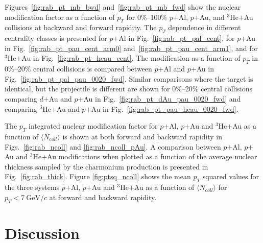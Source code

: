 \documentclass[twocolumn,letterpaper,aps,prc,longbibliography,superscriptaddress,nofootinbib,floatfix]{revtex4-1}
\newcommand{\pt}{\mbox{$p_T$}\xspace}
\newcommand{\meanncoll}{\mbox{$\langle N_{\mathrm coll} \rangle$}\xspace}
\newcommand{\meanptsq}{\mbox{$\langle p_T^2 \rangle$}\xspace}
\newcommand{\dau}{\mbox{$d$$+$Au}\xspace}
\newcommand{\pau}{\mbox{$p$$+$Au}\xspace}
\newcommand{\pal}{\mbox{$p$$+$Al}\xspace}
\newcommand{\heau}{\mbox{$^{3}$He$+$Au}\xspace}
\begin{document}

Figures~\ref{fig:rab_pt_mb_bwd} and~\ref{fig:rab_pt_mb_fwd} show the 
nuclear modification factor as a function of \pt for 0\%--100\% \pal, 
\pau, and \heau collisions at backward and forward rapidity. The \pt 
dependence in different centrality classes is presented for \pal in 
Fig.~\ref{fig:rab_pt_pal_cent}, for \pau in 
Fig.~\ref{fig:rab_pt_pau_cent_arm0} and~\ref{fig:rab_pt_pau_cent_arm1}, 
and for \heau in Fig.~\ref{fig:rab_pt_heau_cent}. The modification as a 
function of \pt in 0\%--20\% central collisions is compared between \pal 
and \pau in Fig.~\ref{fig:rab_pt_pal_pau_0020_fwd}.
Similar comparisons where the target is identical, but the projectile is 
different are shown for 0\%--20\% central collisions comparing \dau and \pau 
in Fig.~\ref{fig:rab_pt_dAu_pau_0020_fwd} and comparing \heau and \pau in 
Fig.~\ref{fig:rab_pt_pau_heau_0020_fwd}. 


The \pt integrated nuclear modification factor for \pal, \pau and \heau as a 
function of \meanncoll is shown at both forward and backward rapidity in 
Figs.~\ref{fig:rab_ncoll} and \ref{fig:rab_ncoll_pAu}.  A comparison 
between \pal, \pau and \heau modifications when plotted as a function of the 
average nuclear thickness sampled by the charmonium production is presented 
in Fig.~\ref{fig:rab_thick}. Figure \ref{fig:ptsq_ncoll} shows the mean \pt 
squared values for the three systems \pal, \pau and \heau as a function of 
\meanncoll for $\pt<7~\mathrm{GeV}/c$ at forward and backward rapidity.




\section{Discussion}
\end{document}
